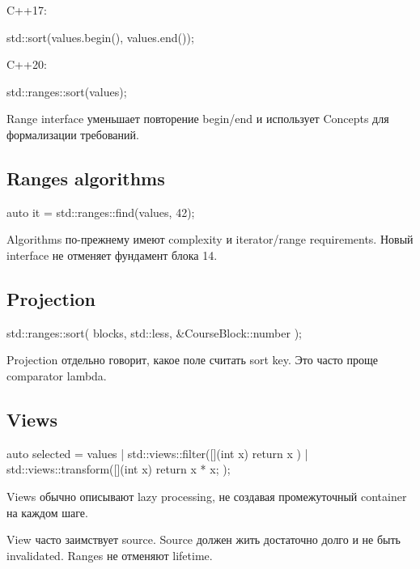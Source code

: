 C++17:

\begin{cppcode}
std::sort(values.begin(), values.end());
\end{cppcode}

C++20:

\begin{cppcode}
std::ranges::sort(values);
\end{cppcode}

Range interface уменьшает повторение begin/end и использует Concepts для
формализации требований.

\subsection{Ranges algorithms}

\begin{cppcode}
auto it = std::ranges::find(values, 42);
\end{cppcode}

Algorithms по-прежнему имеют complexity и iterator/range requirements. Новый
interface не отменяет фундамент блока 14.

\subsection{Projection}

\begin{cppcode}
std::ranges::sort(
    blocks,
    std::less{},
    &CourseBlock::number
);
\end{cppcode}

Projection отдельно говорит, какое поле считать sort key. Это часто проще
comparator lambda.

\subsection{Views}

\begin{cppcode}
auto selected =
    values
    | std::views::filter([](int x) {
          return x %
      })
    | std::views::transform([](int x) {
          return x * x;
      });
\end{cppcode}

Views обычно описывают lazy processing, не создавая промежуточный container на
каждом шаге.

\begin{warningbox}
View часто заимствует source. Source должен жить достаточно долго и не быть
invalidated. Ranges не отменяют lifetime.
\end{warningbox}

